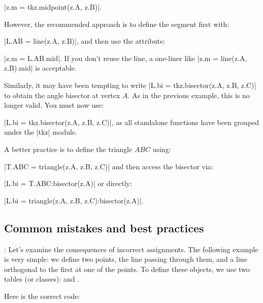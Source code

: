 |z.m = tkz.midpoint(z.A, z.B)|.

However, the recommended approach is to define the segment first with:

|L.AB = line(z.A, z.B)|, and then use the attribute:

|z.m = L.AB.mid|. If you don't reuse the line, a one-liner like |z.m = line(z.A, z.B).mid| is acceptable.

\vspace{12pt}
Similarly, it may have been tempting to write |L.bi = tkz.bisector(z.A, z.B, z.C)| to obtain the angle bisector at vertex $A$. As in the previous example, this is no longer valid. You must now use:

|L.bi = tkz.bisector(z.A, z.B, z.C)|, as all standalone functions have been grouped under the |tkz| module.

A better practice is to define the triangle $ABC$ using:

|T.ABC = triangle(z.A, z.B, z.C)| and then access the bisector via:

|L.bi = T.ABC:bisector(z.A)| or directly:

|L.bi = triangle(z.A, z.B, z.C):bisector(z.A)|.

\subsection{Common mistakes and best practices}

\vspace{1em}
\tkzRHand{\textcolor{red}{Second Warning}}: Let's examine the consequences of incorrect assignments. The following example is very simple: we define two points, the line passing through them, and a line orthogonal to the first at one of the points. To define these objects, we use two tables (or classes):  and .

Here is the correct code:
\begin{mybox}{}
\begin{tkzexample}[latex=.5\textwidth]
\end{tkzexample}
\end{mybox}

